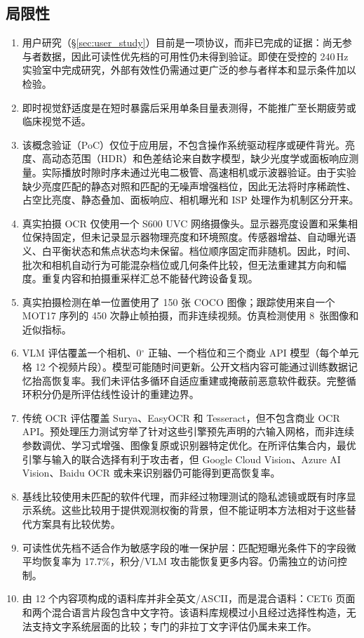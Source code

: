\documentclass{ieeeaccess}
\begin{document}
\subsection{局限性}

\begin{enumerate}
\item 用户研究（\S\ref{sec:user_study}）目前是一项协议，而非已完成的证据：尚无参与者数据，因此可读性优先档的可用性仍未得到验证。即使在受控的 240\,Hz 实验室中完成研究，外部有效性仍需通过更广泛的参与者样本和显示条件加以检验。
\item 即时视觉舒适度是在短时暴露后采用单条目量表测得，不能推广至长期疲劳或临床视觉不适。
\item 该概念验证（PoC）仅位于应用层，不包含操作系统驱动程序或硬件背光。亮度、高动态范围（HDR）和色差结论来自数字模型，缺少光度学或面板响应测量。实际播放时隙时序未通过光电二极管、高速相机或示波器验证。由于实验缺少亮度匹配的静态对照和匹配的无噪声增强档位，因此无法将时序稀疏性、占空比亮度、静态叠加、面板响应、相机曝光和 ISP 处理作为机制区分开来。
\item 真实拍摄 OCR 仅使用一个 S600 UVC 网络摄像头。显示器亮度设置和采集相位保持固定，但未记录显示器物理亮度和环境照度。传感器增益、自动曝光语义、白平衡状态和焦点状态均未保留。档位顺序固定而非随机。因此，时间、批次和相机自动行为可能混杂档位或几何条件比较，但无法重建其方向和幅度。重复内容和拍摄重采样汇总不能替代跨设备复现。
\item 真实拍摄检测在单一位置使用了 150 张 COCO 图像；跟踪使用来自一个 MOT17 序列的 450 次静止帧拍摄，而非连续视频。仿真检测使用 8~张图像和近似指标。
\item VLM 评估覆盖一个相机、0$^{\circ}$ 正轴、一个档位和三个商业 API 模型（每个单元格 12 个视频片段）。模型可能随时间更新。公开文档内容可能通过训练数据记忆抬高恢复率。我们未评估多循环自适应重建或掩蔽前恶意软件截获。完整循环积分仍是所评估线性设计的重建边界。
\item 传统 OCR 评估覆盖 Surya、EasyOCR 和 Tesseract，但不包含商业 OCR API。预处理压力测试穷举了针对这些引擎预先声明的六输入网格，而非连续参数调优、学习式增强、图像复原或识别器特定优化。在所评估集合内，最优引擎与输入的联合选择有利于攻击者，但 Google Cloud Vision、Azure AI Vision、Baidu OCR 或未来识别器仍可能得到更高恢复率。
\item 基线比较使用未匹配的软件代理，而非经过物理测试的隐私滤镜或既有时序显示系统。这些比较用于提供观测权衡的背景，但不能证明本方法相对于这些替代方案具有比较优势。
\item 可读性优先档不适合作为敏感字段的唯一保护层：匹配短曝光条件下的字段微平均恢复率为 17.7\%，积分/VLM 攻击能恢复更多内容。仍需独立的访问控制。
\item 由 12 个内容项构成的语料库并非全英文/ASCII，而是混合语料：CET6 页面和两个混合语言片段包含中文字符。该语料库规模过小且经过选择性构造，无法支持文字系统层面的比较；专门的非拉丁文字评估仍属未来工作。
\end{enumerate}
\end{document}

